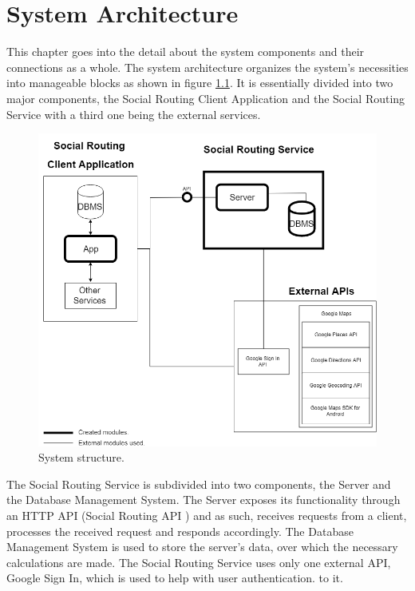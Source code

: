 \chapter{System Architecture}     
        This chapter goes into the detail about the system components and their connections as a whole.
        The system architecture organizes the system's necessities into manageable blocks as shown in figure \ref{fig:systemstructure}.
        It is essentially divided into two major components, the Social Routing Client Application \cite{clientapplicationdocs} and the Social Routing Service with a third one being the external services.
        
        \vfill
        \begin{figure}[h]            
            \includegraphics[width=\textwidth]{images/project-structure/system-structure.PNG}
            \caption{System structure.}
            \label{fig:systemstructure}
        \end{figure} 

        The Social Routing Service is subdivided into two components, the Server and the Database Management System\cite{dbmsdefinition}. The Server exposes its
        functionality through an HTTP\cite{httponlinedocs} API\cite{api} (Social Routing API \cite{apidocs}) and as such, receives requests from a client, processes the received request and responds accordingly.
        The Database Management System is used to store the server's data, over which the necessary calculations are made. 
        The Social Routing Service uses only one external API, Google Sign In\cite{googlesignindocs}, which is used to help with user authentication.
        to it.

